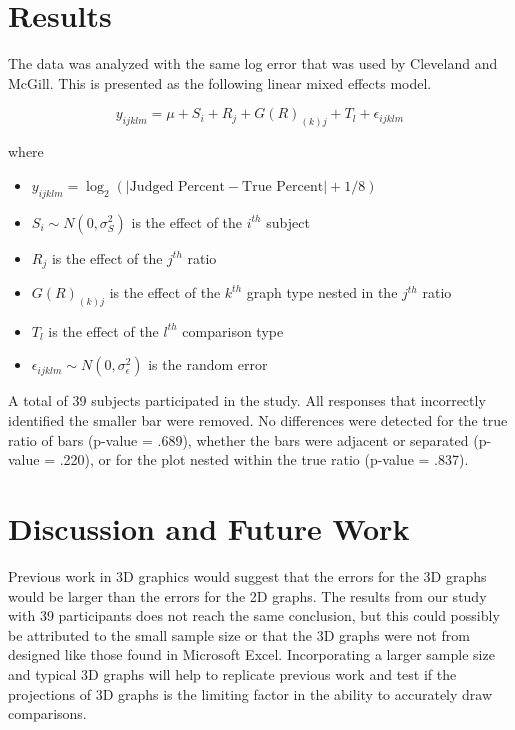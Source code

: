 \documentclass[letterpaper,inpress]{jdsart}
\begin{document}
\hypertarget{results}{%
\section{Results}\label{results}}

The data was analyzed with the same log error that was used by Cleveland and McGill. This is presented as the following linear mixed effects model.

\[y_{ijklm}=\mu+S_i+R_j+G(R)_{(k)j}+T_l+\epsilon_{ijklm}\]

\noindent where

\begin{itemize}
\item
  \(y_{ijklm}=\log_2(|\text{Judged Percent} - \text{True Percent}|+1/8)\)
\item
  \(S_i\sim N(0,\sigma^2_S)\) is the effect of the \(i^{th}\) subject
\item
  \(R_j\) is the effect of the \(j^{th}\) ratio
\item
  \(G(R)_{(k)j}\) is the effect of the \(k^{th}\) graph type nested in the \(j^{th}\) ratio
\item
  \(T_l\) is the effect of the \(l^{th}\) comparison type
\item
  \(\epsilon_{ijklm}\sim N(0,\sigma^2_\epsilon)\) is the random error
\end{itemize}

A total of 39 subjects participated in the study.
All responses that incorrectly identified the smaller bar were removed.
No differences were detected for the true ratio of bars (p-value = .689), whether the bars were adjacent or separated (p-value = .220), or for the plot nested within the true ratio (p-value = .837).

\hypertarget{discussion-and-future-work}{%
\section{Discussion and Future Work}\label{discussion-and-future-work}}

Previous work in 3D graphics would suggest that the errors for the 3D graphs would be larger than the errors for the 2D graphs. The results from our study with 39 participants does not reach the same conclusion, but this could possibly be attributed to the small sample size or that the 3D graphs were not from designed like those found in Microsoft Excel. Incorporating a larger sample size and typical 3D graphs will help to replicate previous work and test if the projections of 3D graphs is the limiting factor in the ability to accurately draw comparisons.
\end{document}
